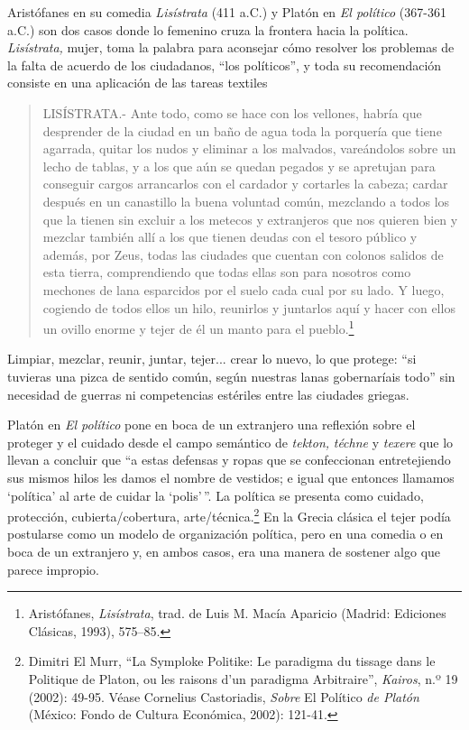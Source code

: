 \documentclass{tufte-handout}
\begin{document}
Aristófanes en su comedia \emph{Lisístrata} (411 a.C.) y Platón en
\emph{El político} (367-361 a.C.) son dos casos donde lo femenino cruza
la frontera hacia la política. \emph{Lisístrata,} mujer, toma la palabra
para aconsejar cómo resolver los problemas de la falta de acuerdo de los
ciudadanos, ``los políticos'', y toda su recomendación consiste en una
aplicación de las tareas textiles

\begin{quote}
LISÍSTRATA.- Ante todo, como se hace con los vellones, habría que
desprender de la ciudad en un baño de agua toda la porquería que tiene
agarrada, quitar los nudos y eliminar a los malvados, vareándolos sobre
un lecho de tablas, y a los que aún se quedan pegados y se apretujan
para conseguir cargos arrancarlos con el cardador y cortarles la cabeza;
cardar después en un canastillo la buena voluntad común, mezclando a
todos los que la tienen sin excluir a los metecos y extranjeros que nos
quieren bien y mezclar también allí a los que tienen deudas con el
tesoro público y además, por Zeus, todas las ciudades que cuentan con
colonos salidos de esta tierra, comprendiendo que todas ellas son para
nosotros como mechones de lana esparcidos por el suelo cada cual por su
lado. Y luego, cogiendo de todos ellos un hilo, reunirlos y juntarlos
aquí y hacer con ellos un ovillo enorme y tejer de él un manto para el
pueblo.\footnote{Aristófanes, \emph{Lisístrata}, trad. de Luis M. Macía
  Aparicio (Madrid: Ediciones Clásicas, 1993), 575--85.}
\end{quote}

Limpiar, mezclar, reunir, juntar, tejer... crear lo nuevo, lo que
protege: ``si tuvieras una pizca de sentido común, según nuestras lanas
gobernaríais todo'' sin necesidad de guerras ni competencias estériles
entre las ciudades griegas.

Platón en \emph{El político} pone en boca de un extranjero una reflexión
sobre el proteger y el cuidado desde el campo semántico de
\emph{tekton,} \emph{t\'echne} y \emph{texere} que lo llevan a concluir
que ``a estas defensas y ropas que se confeccionan entretejiendo sus
mismos hilos les damos el nombre de vestidos; e igual que entonces
llamamos `política' al arte de cuidar la `polis'\,''. La política se
presenta como cuidado, protección, cubierta/cobertura,
arte/técnica.\footnote{Dimitri El Murr, ``La Symploke Politike: Le
  paradigma du tissage dans le Politique de Platon, ou les raisons d'un
  paradigma Arbitraire'', \emph{Kairos}, n.º 19 (2002): 49-95. Véase
  Cornelius Castoriadis, \emph{Sobre} El Político \emph{de Platón}
  (México: Fondo de Cultura Económica, 2002): 121-41.} En la Grecia
clásica el tejer podía postularse como un modelo de organización
política, pero en una comedia o en boca de un extranjero y, en ambos
casos, era una manera de sostener algo que parece impropio.
\end{document}
